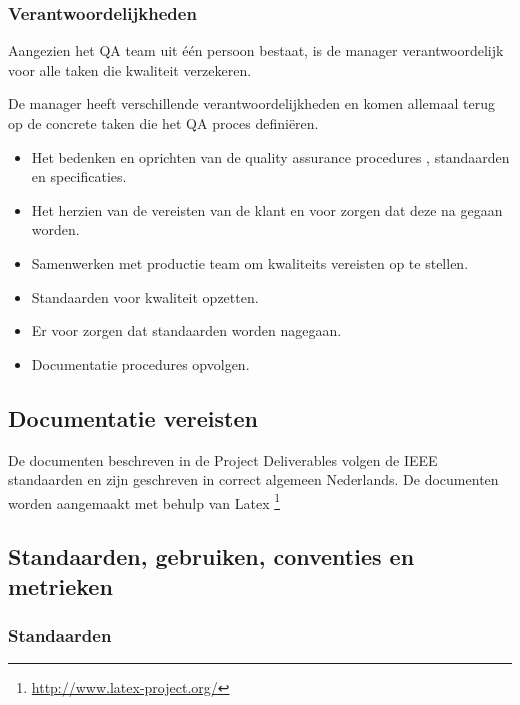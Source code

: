 \subsubsection{Verantwoordelijkheden}

Aangezien het QA team uit één persoon bestaat, is de manager verantwoordelijk voor alle taken die kwaliteit verzekeren.

De manager heeft verschillende verantwoordelijkheden en komen allemaal terug op de concrete taken die het QA proces definiëren.

\begin{itemize}

\item Het bedenken en oprichten van de quality assurance procedures , standaarden en specificaties.

\item Het herzien van de vereisten van de klant en voor zorgen dat deze na gegaan worden.

\item Samenwerken met productie team om kwaliteits vereisten op te stellen.

\item Standaarden voor kwaliteit opzetten.

\item Er voor zorgen dat standaarden worden nagegaan.

\item Documentatie procedures opvolgen.
\end{itemize}

\subsection{Documentatie vereisten}

De documenten beschreven in de Project Deliverables volgen de IEEE standaarden en zijn geschreven in correct algemeen Nederlands. De documenten worden aangemaakt met behulp van Latex \footnote{\url{http://www.latex-project.org/}}



\subsection{Standaarden, gebruiken, conventies en metrieken}

\subsubsection {Standaarden}

